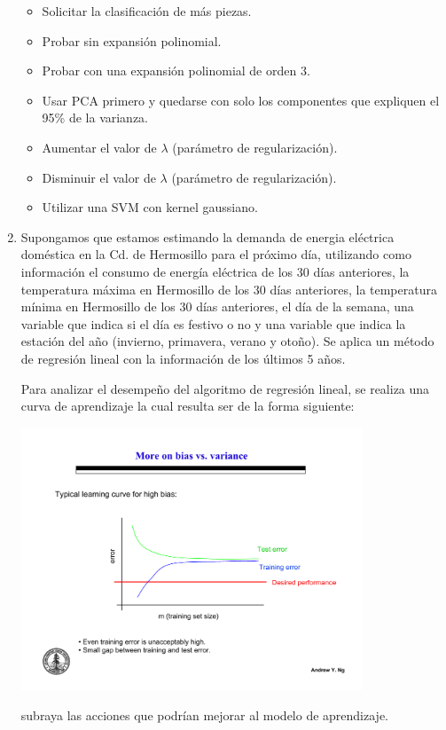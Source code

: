 \documentclass[11pt]{article}
\begin{document}
\begin{enumerate}
\begin{itemize}
\item Solicitar la clasificación de más piezas.
\item Probar sin expansión polinomial.
\item Probar con una expansión polinomial de orden 3.
\item Usar PCA primero y quedarse con solo los componentes que expliquen el 95\% de la varianza.
\item Aumentar el valor de $\lambda$ (parámetro de regularización).
\item Disminuir el valor de $\lambda$ (parámetro de regularización).
\item Utilizar una SVM con kernel gaussiano.
\end{itemize}

\item Supongamos que estamos estimando la demanda de energia eléctrica doméstica
  en la Cd. de Hermosillo para el próximo día, utilizando como información el
  consumo de energía eléctrica de los 30 días anteriores, la temperatura máxima
  en Hermosillo de los 30 días anteriores, la temperatura mínima en Hermosillo
  de los 30 días anteriores, el día de la semana, una variable que indica si el
  día es festivo o no y una variable que indica la estación del año (invierno,
  primavera, verano y otoño). Se aplica un método de regresión lineal con la
  información de los últimos 5 años.

  Para analizar el desempeño del algoritmo de regresión lineal, se realiza una
  curva de aprendizaje la cual resulta ser de la forma siguiente:

  \begin{center}
    \includegraphics[width = 0.8\textwidth]{h_bia.pdf}
  \end{center}
  subraya las acciones que podrían mejorar al modelo de aprendizaje.


\end{enumerate}
\end{document}
